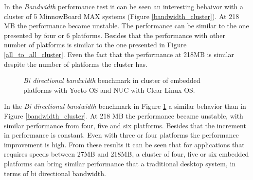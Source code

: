 In the \textit{Bandwidth} performance test it can be seen an interesting
behaivor with a cluster of 5 MinnowBoard MAX systems (Figure
\ref{bandwidth_cluster}). At 218 MB the performance became unstable. The
performance can be similar to the one presented by four or 6 platforms. Besides
that the performance with other number of platforms is similar to the one
presented in Figure \ref{all_to_all_cluster}.  Even the fact that the
performance at 218MB is similar despite the number of platforms the cluster
has.

\begin{figure}[H]
\begin{center}
\end{center}
\caption{\textit{Bi directional bandwidth} benchmark in cluster of embedded platforms with Yocto OS and NUC
with Clear Linux OS.}
\label{bibw_cluster}
\end{figure}

In the \textit{Bi directional bandwidth} benchmark in Figure \ref{bibw_cluster}
a similar behavior than in Figure \ref{bandwidth_cluster}.  At 218 MB the
performance became unstable, with similar performance from four, five and six
platforms. Besides that the increment in performance is constant. Even with
three or four platforms the performance improvement is high. From these results
it can be seen that for applications that requires speeds between 27MB and
218MB, a cluster of four, five or six embedded platforms can bring similar
performance that a traditional desktop system, in terms of bi directional
bandwidth.

